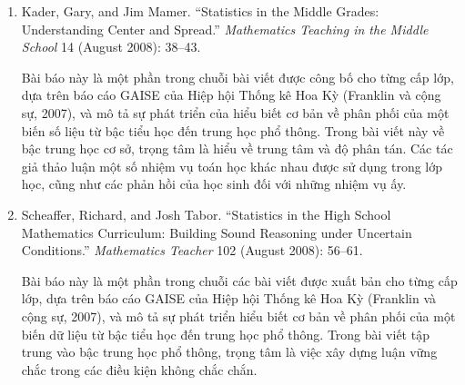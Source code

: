 \documentclass[
  10pt,
  a4paper,
  landscape,
  twoside,
  openany
]{scrbook}
\begin{document}
{{\begin{enumerate}
    \item  Kader, Gary, and Jim Mamer. ``Statistics in the Middle Grades: Understanding Center and Spread.'' \emph{Mathematics Teaching in the Middle School} 14 (August 2008): 38--43.

      Bài báo này là một phần trong chuỗi bài viết được công bố cho từng cấp lớp, dựa trên báo cáo GAISE của Hiệp hội Thống kê Hoa Kỳ (Franklin và cộng sự, 2007), và mô tả sự phát triển của hiểu biết cơ bản về phân phối của một biến số liệu từ bậc tiểu học đến trung học phổ thông. Trong bài viết này về bậc trung học cơ sở, trọng tâm là hiểu về trung tâm và độ phân tán. Các tác giả thảo luận một số nhiệm vụ toán học khác nhau được sử dụng trong lớp học, cũng như các phản hồi của học sinh đối với những nhiệm vụ ấy.
    
    \item Scheaffer, Richard, and Josh Tabor. ``Statistics in the High School Mathematics Curriculum: Building Sound Reasoning under Uncertain Conditions.'' \emph{Mathematics Teacher} 102 (August 2008): 56--61.

      Bài báo này là một phần trong chuỗi các bài viết được xuất bản cho từng cấp lớp, dựa trên báo cáo GAISE của Hiệp hội Thống kê Hoa Kỳ (Franklin và cộng sự, 2007), và mô tả sự phát triển hiểu biết cơ bản về phân phối của một biến dữ liệu từ bậc tiểu học đến trung học phổ thông. Trong bài viết tập trung vào bậc trung học phổ thông, trọng tâm là việc xây dựng luận vững chắc trong các điều kiện không chắc chắn.
  \end{enumerate}}
}
\end{document}
